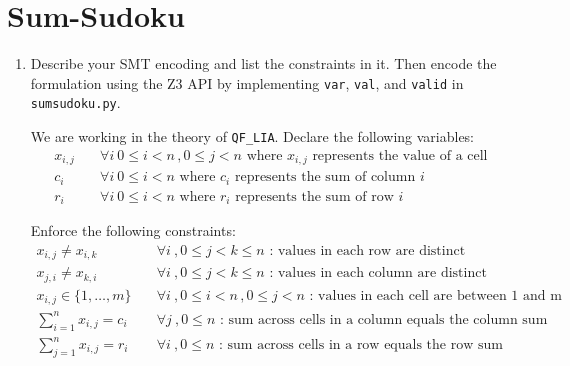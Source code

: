 \section{Sum-Sudoku}
\begin{enumerate}[label=(\alph*)]
  \item {\color{blue}Describe your SMT encoding and list the constraints in it. Then encode the formulation using the Z3 API by implementing \texttt{var}, \texttt{val}, and \texttt{valid} in \texttt{sumsudoku.py}.}

    We are working in the theory of \texttt{QF\_LIA}. Declare the following variables:
    \begin{align*}
      x_{i,j} &\quad \forall i \: 0 \leq i < n \,, 0 \leq j < n \text{ where } x_{i,j} \text{ represents the value of a cell} \\
      c_i &\quad \forall i \: 0 \leq i < n \text{ where } c_i \text{ represents the sum of column } i \\
      r_i &\quad \forall i \: 0 \leq i < n \text{ where } r_i \text{ represents the sum of row } i
    \end{align*}

    Enforce the following constraints:
    \begin{align*}
      x_{i,j} \neq x_{i,k} &\quad \forall i \:, 0 \leq j < k \leq n \text{ : values in each row are distinct} \\
      x_{j,i} \neq x_{k,i} &\quad \forall i \:, 0 \leq j < k \leq n \text{ : values in each column are distinct} \\
      x_{i,j} \in \{1, \dots, m\} &\quad \forall i \:, 0 \leq i < n \,, 0 \leq j < n \text{ : values in each cell are between 1 and m} \\
      \sum_{i=1}^n x_{i,j} = c_i &\quad \forall j \:, 0 \leq n \text{ : sum across cells in a column equals the column sum} \\
      \sum_{j=1}^n x_{i,j} = r_i &\quad \forall i \:, 0 \leq n \text{ : sum across cells in a row equals the row sum}
    \end{align*}


\end{enumerate}
